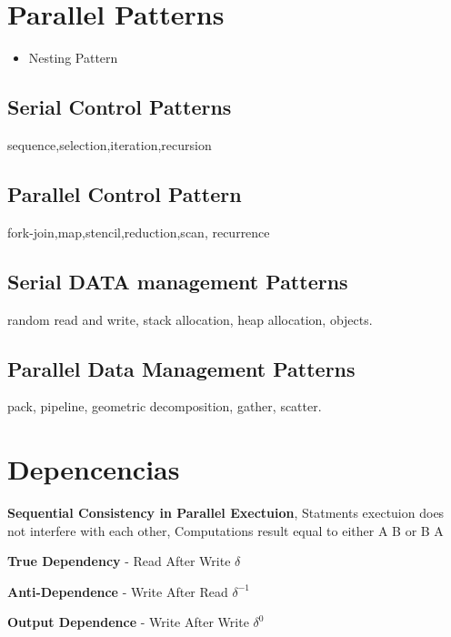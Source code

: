 \section{Parallel Patterns}

\begin{itemize}
    \item Nesting Pattern
\end{itemize}

\subsection{Serial Control Patterns}


sequence,selection,iteration,recursion

\subsection{Parallel Control Pattern}

fork-join,map,stencil,reduction,scan, recurrence

\subsection{Serial DATA management Patterns}

random read and write, stack allocation, heap allocation, objects.

\subsection{Parallel Data Management Patterns}

pack, pipeline, geometric decomposition, gather, scatter.

\section{Depencencias}

\textbf{Sequential Consistency in Parallel Exectuion}, Statments exectuion does not interfere with each other, Computations result equal to either A B or B A \par

\textbf{True Dependency} - Read After Write $\delta$ \par
\textbf{Anti-Dependence} - Write After Read $\delta^{-1}$\par
\textbf{Output Dependence} - Write After Write $\delta^{0}$\par

